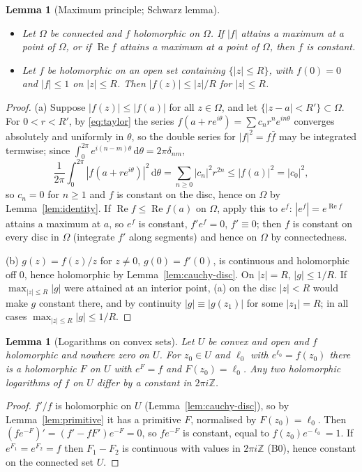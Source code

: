 \documentclass[11pt]{article}
\newtheorem{lemma}[theorem]{Lemma}
\theoremstyle{definition}
\newcommand{\Z}{\mathbb{Z}}
\newcommand{\re}{\operatorname{Re}}
\newcommand{\dd}{\,\mathrm{d}}
\begin{document}
\begin{lemma}[Maximum principle; Schwarz lemma]\label{lem:maxmod}
\begin{itemize}
\item[(a)] Let $\Omega$ be connected and $f$ holomorphic on $\Omega$. If $|f|$ attains a maximum at a point of $\Omega$, or if $\re f$ attains a maximum at a point of $\Omega$, then $f$ is constant.
\item[(b)] Let $f$ be holomorphic on an open set containing $\{|z|\le R\}$, with $f(0)=0$ and $|f|\le1$ on $|z|\le R$. Then $|f(z)|\le|z|/R$ for $|z|\le R$.
\end{itemize}
\end{lemma}
\begin{proof}
(a) Suppose $|f(z)|\le|f(a)|$ for all $z\in\Omega$, and let $\{|z-a|<R'\}\subset\Omega$. For $0<r<R'$, by \eqref{eq:taylor} the series $f(a+re^{i\theta})=\sum c_nr^{n}e^{in\theta}$ converges absolutely and uniformly in $\theta$, so the double series for $|f|^{2}=f\bar f$ may be integrated termwise; since $\int_0^{2\pi}e^{i(n-m)\theta}\dd\theta=2\pi\delta_{nm}$,
\[
\frac1{2\pi}\int_0^{2\pi}|f(a+re^{i\theta})|^{2}\dd\theta=\sum_{n\ge0}|c_n|^{2}r^{2n}\le|f(a)|^{2}=|c_0|^{2},
\]
so $c_n=0$ for $n\ge1$ and $f$ is constant on the disc, hence on $\Omega$ by Lemma~\ref{lem:identity}.
If $\re f\le\re f(a)$ on $\Omega$, apply this to $e^{f}$: $|e^{f}|=e^{\re f}$ attains a maximum at $a$, so $e^{f}$ is constant, $f'e^{f}=0$, $f'\equiv0$; then $f$ is constant on every disc in $\Omega$ (integrate $f'$ along segments) and hence on $\Omega$ by connectedness.

(b) $g(z)=f(z)/z$ for $z\ne0$, $g(0)=f'(0)$, is continuous and holomorphic off $0$, hence holomorphic by Lemma~\ref{lem:cauchy-disc}. On $|z|=R$, $|g|\le1/R$. If $\max_{|z|\le R}|g|$ were attained at an interior point, (a) on the disc $|z|<R$ would make $g$ constant there, and by continuity $|g|\equiv|g(z_1)|$ for some $|z_1|=R$; in all cases $\max_{|z|\le R}|g|\le1/R$.
\end{proof}

\begin{lemma}[Logarithms on convex sets]\label{lem:log}
Let $U$ be convex and open and $f$ holomorphic and nowhere zero on $U$. For $z_0\in U$ and $\ell_0$ with $e^{\ell_0}=f(z_0)$ there is a holomorphic $F$ on $U$ with $e^{F}=f$ and $F(z_0)=\ell_0$. Any two holomorphic logarithms of $f$ on $U$ differ by a constant in $2\pi i\Z$.
\end{lemma}
\begin{proof}
$f'/f$ is holomorphic on $U$ (Lemma~\ref{lem:cauchy-disc}), so by Lemma~\ref{lem:primitive} it has a primitive $F$, normalised by $F(z_0)=\ell_0$. Then $(fe^{-F})'=(f'-fF')e^{-F}=0$, so $fe^{-F}$ is constant, equal to $f(z_0)e^{-\ell_0}=1$.
If $e^{F_1}=e^{F_2}=f$ then $F_1-F_2$ is continuous with values in $2\pi i\Z$ (B0), hence constant on the connected set $U$.
\end{proof}
\end{document}
